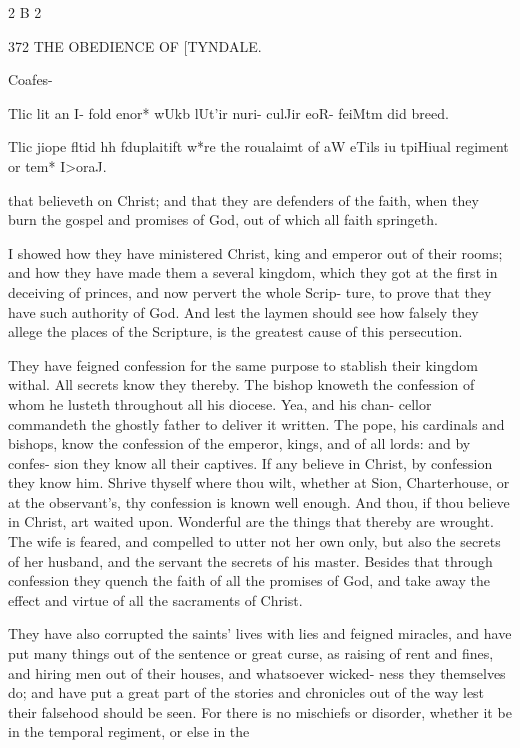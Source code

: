 \documentclass{custom}
\begin{document}
{2 B 2 


372
THE OBEDIENCE OF
[TYNDALE.

Coafes- 

Tlic lit an I- 
fold enor* 
wUkb 
lUt'ir nuri- 
culJir eoR- 
feiMtm did 
breed. 

Tlic jiope 
fltid hh 
fduplaitift 
w*re the 
roualaimt 
of aW eTils 
iu tpiHiual 
regiment 
or tem* 
I>oraJ. 

that believeth on Christ; and that they are defenders of 
the faith, when they burn the gospel and promises of God, 
out of which all faith springeth. 

I showed how they have ministered Christ, king and 
emperor out of their rooms; and how they have made 
them a several kingdom, which they got at the first in 
deceiving of princes, and now pervert the whole Scrip- 
ture, to prove that they have such authority of God. 
And lest the laymen should see how falsely they allege 
the places of the Scripture, is the greatest cause of this 
persecution. 

They have feigned confession for the same purpose to 
stablish their kingdom withal. All secrets know they 
thereby. The bishop knoweth the confession of whom 
he lusteth throughout all his diocese. Yea, and his chan- 
cellor commandeth the ghostly father to deliver it written. 
The pope, his cardinals and bishops, know the confession 
of the emperor, kings, and of all lords: and by confes- 
sion they know all their captives. If any believe in Christ, 
by confession they know him. Shrive thyself where thou 
wilt, whether at Sion, Charterhouse, or at the observant's, 
thy confession is known well enough. And thou, if thou 
believe in Christ, art waited upon. Wonderful are the 
things that thereby are wrought. The wife is feared, and 
compelled to utter not her own only, but also the secrets 
of her husband, and the servant the secrets of his master. 
Besides that through confession they quench the faith of 
all the promises of God, and take away the effect and 
virtue of all the sacraments of Christ. 

They have also corrupted the saints' lives with lies and 
feigned miracles, and have put many things out of the 
sentence or great curse, as raising of rent and fines, and 
hiring men out of their houses, and whatsoever wicked- 
ness they themselves do; and have put a great part of the 
stories and chronicles out of the way lest their falsehood 
should be seen. For there is no mischiefs or disorder, 
whether it be in the temporal regiment, or else in the 


}
\end{document}
